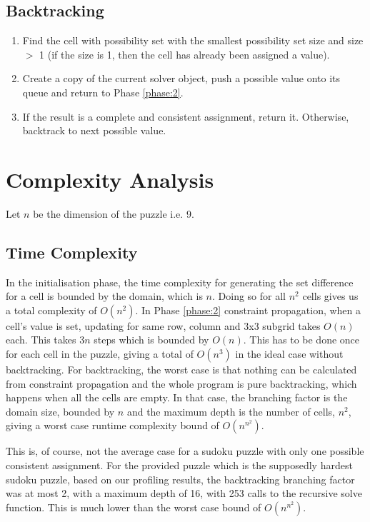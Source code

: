 \documentclass[11pt, a4paper]{article}
\begin{document}
\subsection{Backtracking}
\label{phase:3}
\begin{enumerate}
  \item Find the cell with possibility set with the smallest possibility set size and size $>$ 1 (if the size is 1, then the cell has already been assigned a value).
  \item Create a copy of the current solver object, push a possible value onto its queue and return to Phase \ref{phase:2}.
  \item If the result is a complete and consistent assignment, return it. Otherwise, backtrack to next possible value.
\end{enumerate}

\section{Complexity Analysis}
Let $n$ be the dimension of the puzzle i.e. 9.

\subsection{Time Complexity}
In the initialisation phase, the time complexity for generating the set difference for a cell is bounded by the domain, which is $n$.
Doing so for all $n^2$ cells gives us a total complexity of $O(n^2)$.
In Phase \ref{phase:2} constraint propagation, when a cell's value is set, updating for same row, column and 3x3 subgrid takes $O(n)$ each.
This takes $3n$ steps which is bounded by $O(n)$.
This has to be done once for each cell in the puzzle, giving a total of $O(n^3)$ in the ideal case without backtracking.
For backtracking, the worst case is that nothing can be calculated from constraint propagation and the whole program is pure backtracking, which happens when all the cells are empty.
In that case, the branching factor is the domain size, bounded by $n$ and the maximum depth is the number of cells, $n^2$, giving a worst case runtime complexity bound of $O(n^{n^2})$.

This is, of course, not the average case for a sudoku puzzle with only one possible consistent assignment.
For the provided puzzle which is the supposedly hardest sudoku puzzle, based on our profiling results, the backtracking branching factor was at most 2, with a maximum depth of 16, with 253 calls to the recursive solve function.
This is much lower than the worst case bound of $O(n^{n^2})$.
\end{document}
